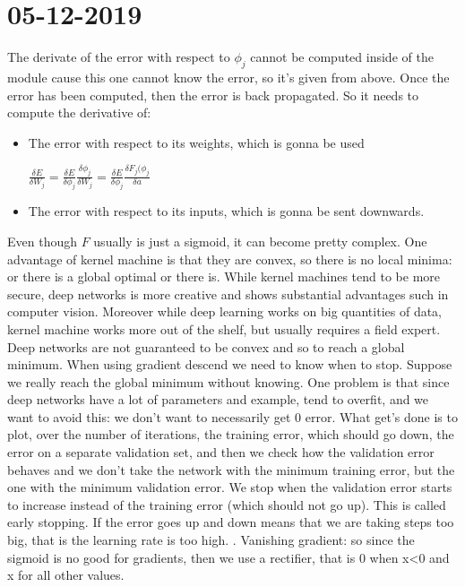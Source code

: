 \chapter{05-12-2019}
The derivate of the error with respect to $\phi_j$ cannot be computed inside of the module cause this one cannot know the error, so it's given from above. Once the error has been computed, then the error is back propagated. \newline
So it needs to compute the derivative of:
\newcommand{\derivative}[2]{\frac{\delta#1}{\delta#2}}
\begin{itemize}
	\item The error with respect to its weights, which is gonna be used
		\begin{center}
			\begin{center}
				$\displaystyle \derivative{E}{W_j}=\derivative{E}{\phi_j}\derivative{\phi_j}{W_j}=\derivative{E}{\phi_j}\derivative{F_j(\phi_j}{a}$
			\end{center}
		\end{center}
	\item The error with respect to its inputs, which is gonna be sent downwards. 
\end{itemize}
Even though $F$ usually is just a sigmoid, it can become pretty complex.\newline
One advantage of kernel machine is that they are convex, so there is no local minima: or there is a global optimal or there is. While kernel machines tend to be more secure, deep networks is more creative and shows substantial advantages such in computer vision. Moreover while deep learning works on big quantities of data, kernel machine works more out of the shelf, but usually requires a field expert.\newline
Deep networks are not guaranteed to be convex and so to reach a global minimum. \newline
When using gradient descend we need to know when to stop. Suppose we really reach the global minimum without knowing. One problem is that since deep networks have a lot of parameters and example, tend to overfit, and we want to avoid this: we don't want to necessarily get 0 error. What get's done is to plot, over the number of iterations, the training error, which should go down, the error on a separate validation set, and then we check how the validation error behaves and we don't take the network with the minimum training error, but the one with the minimum validation error. We stop when the validation error starts to increase instead of the training error (which should not go up). This is called early stopping. \newline
If the error goes up and down means that we are taking steps too big, that is the learning rate is too high. .\newline
Vanishing gradient: so since the sigmoid is no good for gradients, then we use a rectifier, that is 0 when x<0 and x for all other values. \newline
